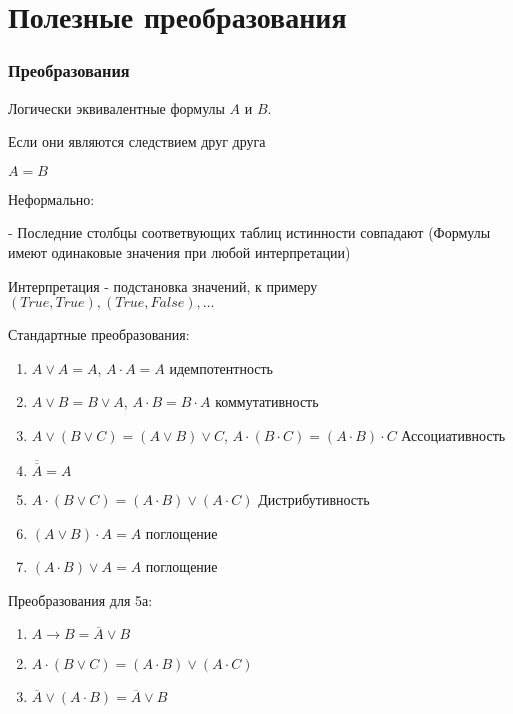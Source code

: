 \documentclass[10pt]{beamer}
\theoremstyle{remark}
\theoremstyle{definition}
\begin{document}
\section{Полезные преобразования}
\begin{frame}[allowframebreaks]
\frametitle{Преобразования}

Логически эквивалентные формулы $A$ и $B$.

Если они являются следствием друг друга

$A = B$

Неформально: 

- Последние столбцы соответвующих таблиц истинности совпадают (Формулы имеют одинаковые значения при любой интерпретации)

Интерпретация - подстановка значений, к примеру $(True, True), (True, False), ...$


\framebreak

Стандартные преобразования: 
\begin{enumerate}
    \item $A \vee A = A$, $A \cdot A = A$ идемпотентность
    \item $A \vee B = B \vee A$, $A \cdot B = B \cdot A$ коммутативность
    \item $A \vee (B \vee C) = (A \vee B) \vee C$, $A \cdot (B \cdot C) = (A \cdot B) \cdot C$ Ассоциативность
    \item $\overline{\overline{A}} = A$
    
    \item $A \cdot (B \vee C) = (A \cdot B) \vee (A \cdot C)$ Дистрибутивность
    \item $(A \vee B) \cdot A = A$ поглощение
    \item $(A \cdot B) \vee A = A$ поглощение

\end{enumerate}

\framebreak

Преобразования для 5а: 
\begin{enumerate}
    \item $A \to B = \overline{A} \vee B$
    \item $A \cdot (B \vee C) = (A \cdot B) \vee (A \cdot C)$
    
    \item $\overline{A} \vee (A \cdot B) = \overline{A} \vee B$
\end{enumerate}

\end{frame}
\end{document}
